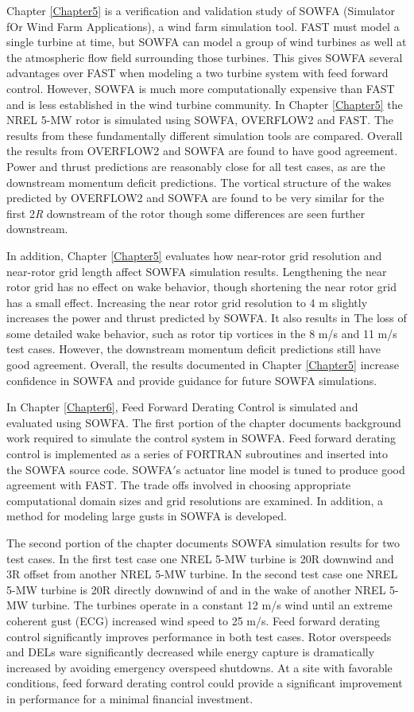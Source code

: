 Chapter \ref{Chapter5} is a verification and validation study of SOWFA (Simulator fOr Wind Farm Applications), a wind farm simulation tool. FAST must model a single turbine at time, but SOWFA can model a group of wind turbines as well at the atmospheric flow field surrounding those turbines. This gives SOWFA several advantages over FAST when modeling a two turbine system with feed forward control. However, SOWFA is much more computationally expensive than FAST and is less established in the wind turbine community. In Chapter \ref{Chapter5} the NREL 5-MW rotor is simulated using SOWFA, OVERFLOW2 and FAST. The results from these fundamentally different simulation tools are compared. Overall the results from OVERFLOW2 and SOWFA are found to have good agreement.  Power and thrust predictions are reasonably close for all test cases, as are the downstream momentum deficit predictions. The vortical structure of the wakes predicted by OVERFLOW2 and SOWFA are found to be very similar for the first 2\emph{R} downstream of the rotor though some differences are seen further downstream.

In addition, Chapter \ref{Chapter5} evaluates how near-rotor grid resolution and near-rotor grid length affect SOWFA simulation results. Lengthening the near rotor grid has no effect on wake behavior, though shortening the near rotor grid has a small effect. Increasing the near rotor grid resolution to 4 m slightly increases the power and thrust predicted by SOWFA. It also results in The loss of some detailed wake behavior, such as rotor tip vortices in the 8 m/s and 11 m/s test cases. However, the downstream momentum deficit predictions still have good agreement. Overall, the results documented in Chapter \ref{Chapter5} increase confidence in SOWFA and provide guidance for future SOWFA simulations.

In Chapter \ref{Chapter6}, Feed Forward Derating Control is simulated and evaluated using SOWFA. The first portion of the chapter documents background work required to simulate the control system in SOWFA. Feed forward derating control is implemented as a series of FORTRAN subroutines and inserted into the SOWFA source code. SOWFA$'$s actuator line model is tuned to produce good agreement with FAST. The trade offs involved in choosing appropriate computational domain sizes and grid resolutions are examined. In addition, a method for modeling large gusts in SOWFA is developed.

The second portion of the chapter documents SOWFA simulation results for two test cases. In the first test case one NREL 5-MW turbine is 20R downwind and 3R offset from another NREL 5-MW turbine. In the second test case one NREL 5-MW turbine is 20R directly downwind of and in the wake of another NREL 5-MW turbine. The turbines operate in a constant 12 m/s wind until an extreme coherent gust (ECG) increased wind speed to 25 m/s. Feed forward derating control significantly improves performance in both test cases. Rotor overspeeds and DELs ware significantly decreased while energy capture is dramatically increased by avoiding emergency overspeed shutdowns.  At a site with favorable conditions, feed forward derating control could provide a significant improvement in performance for a minimal financial investment.


